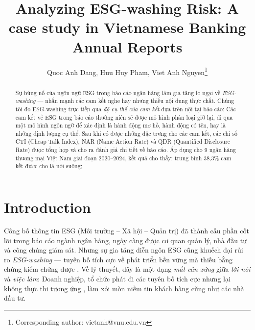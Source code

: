 \documentclass[runningheads]{llncs}
\begin{document}
%
\title{Analyzing ESG-washing Risk: A case study in Vietnamese Banking Annual Reports}
%
%
\author{Quoc Anh Dang, Huu Huy Pham, Viet Anh Nguyen\thanks{Corresponding author: vietanh@vnu.edu.vn}}
%
%
%
\maketitle              %
%
\begin{abstract}
Sự bùng nổ của ngôn ngữ ESG trong báo cáo ngân hàng làm gia tăng lo ngại về \emph{ESG-washing} --- nhấn mạnh các cam kết nghe hay nhưng thiếu nội dung thực chất. Chúng tôi đo ESG-washing trực tiếp qua \emph{độ cụ thể của cam kết} dựa trên nội tại báo cáo: Các cam kết về ESG trong báo cáo thường niên sẽ được mô hình phân loại giữ lại, đi qua một mô hình ngôn ngữ để xác định là hành động mơ hồ, hành động có tên, hay là những định lượng cụ thể. Sau khi có được những đặc trưng cho các cam kết, các chỉ số CTI (Cheap Talk Index), NAR (Name Action Rate) và QDR (Quantified Disclosure Rate) được tổng hợp và cho ra đánh giá chi tiết về báo cáo. Áp dụng cho 9 ngân hàng thương mại Việt Nam giai đoạn 2020--2024, kết quả cho thấy: trung bình 38{,}3\% cam kết được cho là nói suông;


\end{abstract}
%
\section{Introduction}
Công bố thông tin ESG (Môi trường -- Xã hội -- Quản trị) đã thành cấu phần cốt lõi trong báo cáo ngành ngân hàng, ngày càng được cơ quan quản lý, nhà đầu tư và công chúng giám sát. Nhưng sự gia tăng diễn ngôn ESG cũng khuếch đại rủi ro \emph{ESG-washing} --- tuyên bố tích cực về phát triển bền vững mà thiếu bằng chứng kiểm chứng được \cite{florstedt2025detecting,delmas2011drivers}. Về lý thuyết, đây là một dạng \emph{mất cân xứng} giữa \emph{lời nói} và \emph{việc làm}: Doanh nghiệp, tổ chức phát đi các tuyên bố tích cực nhưng lại không thực thi tương ứng \cite{bromley2012smoke,marquis2016scrutiny}, làm xói mòn niềm tin khách hàng cũng như các nhà đầu tư\cite{lagasio2024esg,kathan2025you}.
\end{document}
